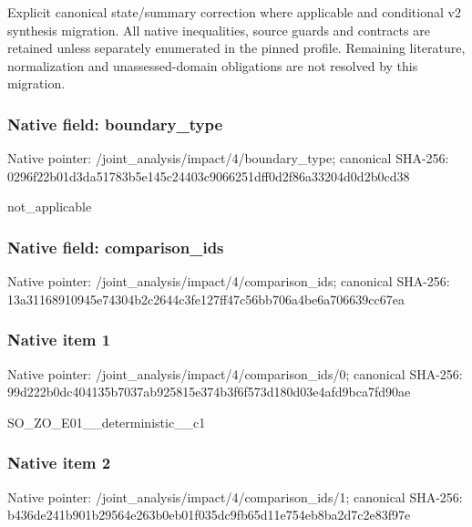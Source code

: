 \documentclass[10pt,a4paper]{article}
\begin{document}
\begingroup\raggedright\sloppy Explicit canonical state/\allowbreak{}summary correction where applicable and conditional v2 synthesis migration. All native inequalities,\allowbreak{} source guards and contracts are retained unless separately enumerated in the pinned profile. Remaining literature,\allowbreak{} normalization and unassessed-domain obligations are not resolved by this migration.\par\endgroup

\subsubsection{Native field: boundary\_\allowbreak{}type}
Native pointer: /joint\_\allowbreak{}analysis/impact/4/boundary\_\allowbreak{}type; canonical SHA-256: 0296f22b01d3da51783b5e145c24403c9066251dff0d2f86a33204d0d2b0cd38

\begingroup\raggedright\sloppy not\_\allowbreak{}applicable\par\endgroup

\subsubsection{Native field: comparison\_\allowbreak{}ids}
Native pointer: /joint\_\allowbreak{}analysis/impact/4/comparison\_\allowbreak{}ids; canonical SHA-256: 13a31168910945e74304b2c2644c3fe127ff47c56bb706a4be6a706639cc67ea

\subsubsection{Native item 1}
Native pointer: /joint\_\allowbreak{}analysis/impact/4/comparison\_\allowbreak{}ids/0; canonical SHA-256: 99d222b0dc404135b7037ab925815e374b3f6f573d180d03e4afd9bca7fd90ae

\begingroup\raggedright\sloppy SO\_\allowbreak{}ZO\_\allowbreak{}E01\_\allowbreak{}\_\allowbreak{}deterministic\_\allowbreak{}\_\allowbreak{}c1\par\endgroup

\subsubsection{Native item 2}
Native pointer: /joint\_\allowbreak{}analysis/impact/4/comparison\_\allowbreak{}ids/1; canonical SHA-256: b436de241b901b29564e263b0eb01f035dc9fb65d11e754eb8ba2d7c2e83f97e
\end{document}
